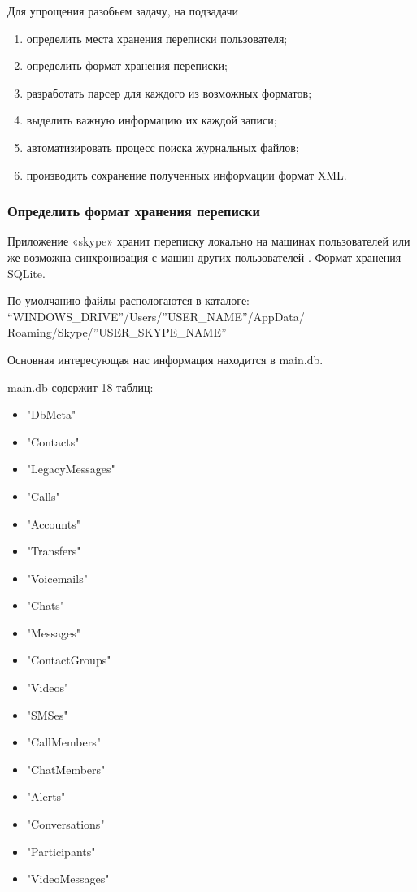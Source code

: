 Для упрощения разобьем задачу, на подзадачи

\begin{enumerate}
\item определить места хранения переписки пользователя;
\item определить формат хранения переписки;
\item разработать парсер для каждого из возможных форматов;
\item выделить важную информацию их каждой записи;
\item автоматизировать процесс поиска журнальных файлов;
\item производить сохранение полученных информации формат XML.
\end{enumerate}


\subsubsection{Определить формат хранения переписки}

Приложение «skype» хранит переписку локально на машинах пользователей или же возможна синхронизация с машин других пользователей \cite{skypechat}. Формат хранения SQLite. 

По умолчанию файлы распологаются в каталоге:\\ “WINDOWS\_DRIVE”/Users/”USER\_NAME”/AppData/\\Roaming/Skype/”USER\_SKYPE\_NAME”

Основная интересующая нас информация находится в main.db.

main.db  содержит 18 таблиц:

\begin{itemize} 
\item"DbMeta"
\item"Contacts"
\item"LegacyMessages"
\item"Calls"
\item"Accounts"
\item"Transfers"
\item"Voicemails"
\item"Chats"
\item"Messages"   
\item"ContactGroups"
\item"Videos"
\item"SMSes"
\item"CallMembers"
\item"ChatMembers"
\item"Alerts"
\item"Conversations"
\item"Participants"
\item"VideoMessages"
\end{itemize}

